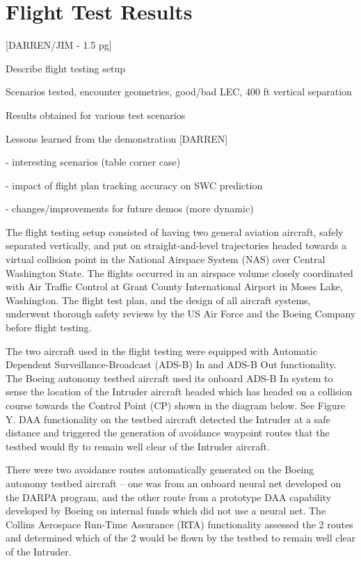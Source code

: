 \section{Flight Test Results}

[DARREN/JIM - 1.5 pg]

Describe flight testing setup

Scenarios tested, encounter geometries, good/bad LEC, 400 ft vertical separation

Results obtained for various test scenarios

Lessons learned from the demonstration [DARREN]

- interesting scenarios (table corner case)

- impact of flight plan tracking accuracy on SWC prediction

- changes/improvements for future demos (more dynamic)

The flight testing setup consisted of having two general aviation aircraft, safely separated vertically, and put on straight-and-level trajectories headed towards a virtual collision point in the National Airspace System (NAS) over Central Washington State.  The flights occurred in an airspace volume closely coordinated with Air Traffic Control at Grant County International Airport in Moses Lake, Washington.  The flight test plan, and the design of all aircraft systems, underwent thorough safety reviews by the US Air Force and the Boeing Company before flight testing.

The two aircraft used in the flight testing were equipped with Automatic Dependent Surveillance-Broadcast (ADS-B) In and ADS-B Out functionality.  The Boeing autonomy testbed aircraft used its onboard ADS-B In system to sense the location of the Intruder aircraft headed which has headed on a collision course towards the Control Point (CP) shown in the diagram below.  See Figure Y.  DAA functionality on the testbed aircraft detected the Intruder at a safe distance and triggered the generation of avoidance waypoint routes that the testbed would fly to remain well clear of the Intruder aircraft.  

There were two avoidance routes automatically generated on the Boeing autonomy testbed aircraft – one was from an onboard neural net developed on the DARPA program, and the other route from a prototype DAA capability developed by Boeing on internal funds which did not use a neural net.
The Collins Aerospace Run-Time Assurance (RTA) functionality assessed the 2 routes and determined which of the 2 would be flown by the testbed to remain well clear of the Intruder.

